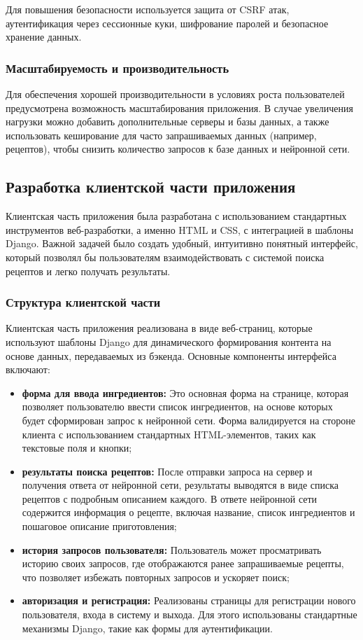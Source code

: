 {Для повышения безопасности используется защита от CSRF атак, аутентификация через сессионные куки, шифрование паролей и безопасное хранение данных.

\subsubsection*{Масштабируемость и производительность}
Для обеспечения хорошей производительности в условиях роста пользователей предусмотрена возможность масштабирования приложения. В случае увеличения нагрузки можно добавить дополнительные серверы и базы данных, а также использовать кеширование для часто запрашиваемых данных (например, рецептов), чтобы снизить количество запросов к базе данных и нейронной сети.

\newpage

\subsection{Разработка клиентской части приложения}
{
    Клиентская часть приложения была разработана с использованием стандартных инструментов веб-разработки, а именно HTML и CSS, с интеграцией в шаблоны Django. Важной задачей было создать удобный, интуитивно понятный интерфейс, который позволял бы пользователям взаимодействовать с системой поиска рецептов и легко получать результаты.

    \subsubsection*{Структура клиентской части}
    
    Клиентская часть приложения реализована в виде веб-страниц, которые используют шаблоны Django для динамического формирования контента на основе данных, передаваемых из бэкенда. Основные компоненты интерфейса включают:
    
    \begin{itemize}
        \item \textbf{форма для ввода ингредиентов:} Это основная форма на странице, которая позволяет пользователю ввести список ингредиентов, на основе которых будет сформирован запрос к нейронной сети. Форма валидируется на стороне клиента с использованием стандартных HTML-элементов, таких как текстовые поля и кнопки;
        \item \textbf{результаты поиска рецептов:} После отправки запроса на сервер и получения ответа от нейронной сети, результаты выводятся в виде списка рецептов с подробным описанием каждого. В ответе нейронной сети содержится информация о рецепте, включая название, список ингредиентов и пошаговое описание приготовления;
        \item \textbf{история запросов пользователя:} Пользователь может просматривать историю своих запросов, где отображаются ранее запрашиваемые рецепты, что позволяет избежать повторных запросов и ускоряет поиск;
        \item \textbf{авторизация и регистрация:} Реализованы страницы для регистрации нового пользователя, входа в систему и выхода. Для этого использованы стандартные механизмы Django, такие как формы для аутентификации.
    \end{itemize}
    
}}
